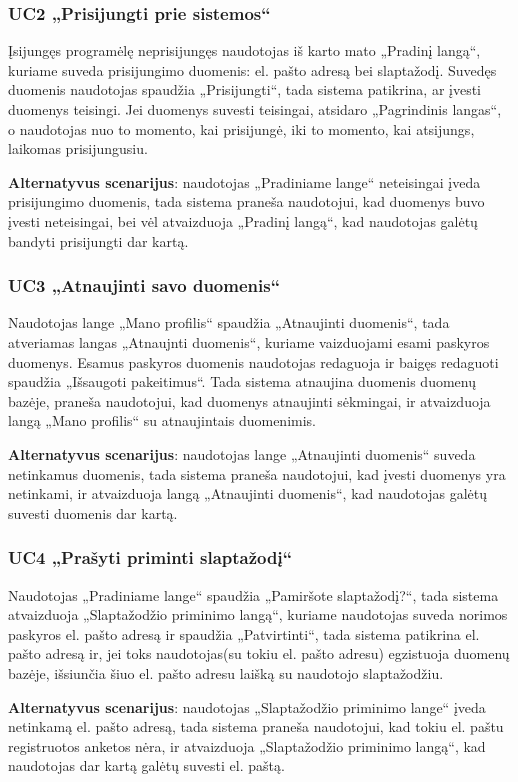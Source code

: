 \documentclass{VUMIFPSbakalaurinis}
\begin{document}
\subsubsection{UC2 „Prisijungti prie sistemos“}
Įsijungęs programėlę neprisijungęs naudotojas iš karto mato „Pradinį langą“, kuriame suveda prisijungimo duomenis: el. pašto adresą bei slaptažodį. Suvedęs duomenis naudotojas spaudžia „Prisijungti“, tada sistema patikrina, ar įvesti duomenys teisingi. Jei duomenys suvesti teisingai, atsidaro „Pagrindinis langas“, o naudotojas nuo to momento, kai prisijungė, iki to momento, kai atsijungs, laikomas prisijungusiu. 
\par \textbf{Alternatyvus scenarijus}: naudotojas „Pradiniame lange“ neteisingai įveda prisijungimo duomenis, tada sistema praneša naudotojui, kad duomenys buvo įvesti neteisingai, bei vėl atvaizduoja „Pradinį langą“, kad naudotojas galėtų bandyti prisijungti dar kartą.
\subsubsection{UC3 „Atnaujinti savo duomenis“}
Naudotojas lange „Mano profilis“ spaudžia „Atnaujinti duomenis“, tada atveriamas langas „Atnaujnti duomenis“, kuriame vaizduojami esami paskyros duomenys. Esamus paskyros duomenis naudotojas redaguoja ir baigęs redaguoti spaudžia „Išsaugoti pakeitimus“. Tada sistema atnaujina duomenis duomenų bazėje, praneša naudotojui, kad duomenys atnaujinti sėkmingai, ir atvaizduoja langą „Mano profilis“ su atnaujintais duomenimis. 
\par\textbf{Alternatyvus scenarijus}: naudotojas lange „Atnaujinti duomenis“ suveda netinkamus duomenis, tada sistema praneša naudotojui, kad įvesti duomenys yra netinkami, ir atvaizduoja langą „Atnaujinti duomenis“, kad naudotojas galėtų suvesti duomenis dar kartą.
\subsubsection{UC4 „Prašyti priminti slaptažodį“}
Naudotojas „Pradiniame lange“ spaudžia „Pamiršote slaptažodį?“, tada sistema atvaizduoja „Slaptažodžio priminimo langą“, kuriame naudotojas suveda norimos paskyros el. pašto adresą ir spaudžia „Patvirtinti“, tada sistema patikrina el. pašto adresą ir, jei toks naudotojas(su tokiu el. pašto adresu) egzistuoja duomenų bazėje, išsiunčia šiuo el. pašto adresu laišką su naudotojo slaptažodžiu. 
\par \textbf{Alternatyvus scenarijus}: naudotojas „Slaptažodžio priminimo lange“ įveda netinkamą el. pašto adresą, tada sistema praneša naudotojui, kad tokiu el. paštu registruotos anketos nėra, ir atvaizduoja „Slaptažodžio priminimo langą“, kad naudotojas dar kartą galėtų suvesti el. paštą.
\end{document}
